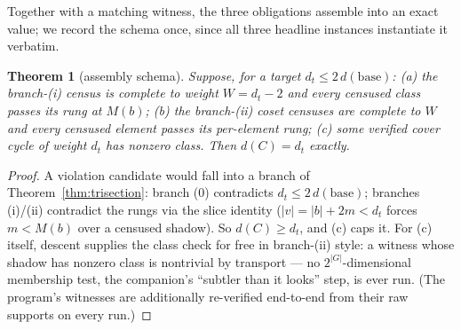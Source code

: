 \documentclass[11pt]{article}
\theoremstyle{plain}
\newtheorem{theorem}{Theorem}[section]
\theoremstyle{definition}
\theoremstyle{remark}
\newcommand{\base}{\mathrm{base}}
\newcommand{\wt}[1]{\lvert #1\rvert}
\begin{document}
Together with a matching witness, the three obligations assemble into an
exact value; we record the schema once, since all three headline
instances instantiate it verbatim.

\begin{theorem}[assembly schema]\label{thm:assembly}
Suppose, for a target $d_t \leq 2\,d(\base)$:
\emph{(a)} the branch-(i) census is complete to weight $W = d_t - 2$ and
every censused class passes its rung at $M(b)$;
\emph{(b)} the branch-(ii) coset censuses are complete to $W$ and every
censused element passes its per-element rung;
\emph{(c)} some verified cover cycle of weight $d_t$ has nonzero class.
Then $d(C) = d_t$ exactly.
\end{theorem}

\begin{proof}
A violation candidate would fall into a branch of
Theorem~\ref{thm:trisection}: branch (0) contradicts $d_t \leq
2\,d(\base)$; branches (i)/(ii) contradict the rungs via the slice
identity ($\wt v = \wt b + 2m < d_t$ forces $m < M(b)$ over a censused
shadow). So $d(C) \geq d_t$, and (c) caps it. For (c) itself, descent
supplies the class check for free in branch-(ii) style: a witness whose
shadow has nonzero class is nontrivial by transport --- no
$2^{|G|}$-dimensional membership test, the companion's ``subtler than it
looks'' step, is ever run. (The program's witnesses are additionally
re-verified end-to-end from their raw supports on every run.)
\end{proof}
\end{document}
